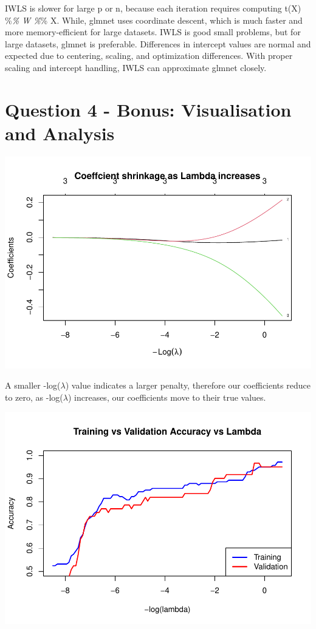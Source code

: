 \documentclass[12pt,halfline,a4paper,]{ouparticle}
\begin{document}
IWLS is slower for large p or n, because each iteration requires
computing t(X) \%\emph{\% W \%}\% X. While, glmnet uses coordinate
descent, which is much faster and more memory-efficient for large
datasets. IWLS is good small problems, but for large datasets, glmnet is
preferable. Differences in intercept values are normal and expected due
to centering, scaling, and optimization differences. With proper scaling
and intercept handling, IWLS can approximate glmnet closely.

\section{Question 4 - Bonus: Visualisation and
Analysis}\label{question-4---bonus-visualisation-and-analysis}

\includegraphics[width=1\linewidth]{skeleton-2_files/figure-latex/unnamed-chunk-7-1}

A smaller -log(\(\lambda\)) value indicates a larger penalty, therefore
our coefficients reduce to zero, as -log(\(\lambda\)) increases, our
coefficients move to their true values.

\includegraphics[width=1\linewidth]{skeleton-2_files/figure-latex/unnamed-chunk-8-1}
\end{document}
